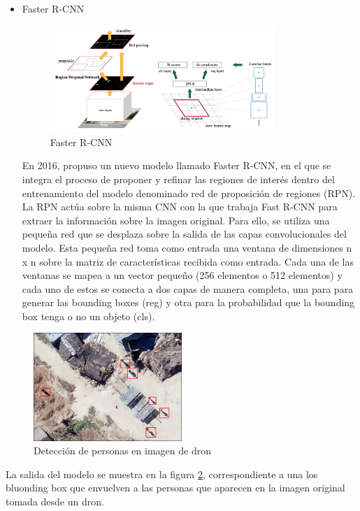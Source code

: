 \begin{itemize}
    \item Faster R-CNN \\
    \begin{figure}[H]
        \centering
        \includegraphics[width=0.80\textwidth]{Imagenes/GeoAI/FasterRCNN.png}
        \caption{Faster R-CNN} \label{fig:FasterRCNN}
    \end{figure}
    En 2016, propuso un nuevo modelo llamado Faster R-CNN, en el que se integra el proceso de proponer y refinar las regiones de interés dentro del entrenamiento del
    modelo denominado red de proposición de regiones (RPN).
    La RPN actúa sobre la misma CNN con la que trabaja Fast R-CNN para extraer la información sobre la imagen original. 
    Para ello, se utiliza una pequeña red que se desplaza sobre la salida de las capas convolucionales del modelo.
    Esta pequeña red toma como entrada una ventana de dimensiones n x n sobre la matriz de características recibida como entrada.
    Cada una de las ventanas se mapea a un vector pequeño (256 elementos o 512 elementos) y cada uno de estos se conecta a
    dos capas de manera completa, una para para generar las bounding boxes (reg) y
    otra para la probabilidad que la bounding box tenga o no un objeto (cls).
\end{itemize}

\begin{figure}[H]
    \centering
    \includegraphics[width=0.50\textwidth]{Imagenes/GeoAI/deteccion-personas.png}
    \caption{Detección de personas en imagen de dron} \label{fig:deteccion-personas}
\end{figure}

La salida del modelo se muestra en la figura \ref{fig:deteccion-personas}, correspondiente a una los bluonding box que envuelven a las personas que aparecen en la imagen original tomada desde un dron.

